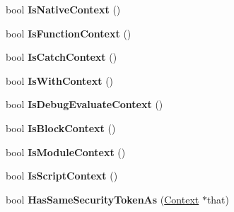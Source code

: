 \begin{DoxyCompactItemize}
\item 
bool {\bfseries Is\+Native\+Context} ()\hypertarget{classv8_1_1internal_1_1_context_a3c1dc7d83a558bb508f062821821e499}{}\label{classv8_1_1internal_1_1_context_a3c1dc7d83a558bb508f062821821e499}

\item 
bool {\bfseries Is\+Function\+Context} ()\hypertarget{classv8_1_1internal_1_1_context_ad6c48b6346d3914ece1b8a84979bc188}{}\label{classv8_1_1internal_1_1_context_ad6c48b6346d3914ece1b8a84979bc188}

\item 
bool {\bfseries Is\+Catch\+Context} ()\hypertarget{classv8_1_1internal_1_1_context_acd9e4ea343c0680ffc6b2edb9724d7e0}{}\label{classv8_1_1internal_1_1_context_acd9e4ea343c0680ffc6b2edb9724d7e0}

\item 
bool {\bfseries Is\+With\+Context} ()\hypertarget{classv8_1_1internal_1_1_context_ad2f6f05429ffa28117936bbc818962f3}{}\label{classv8_1_1internal_1_1_context_ad2f6f05429ffa28117936bbc818962f3}

\item 
bool {\bfseries Is\+Debug\+Evaluate\+Context} ()\hypertarget{classv8_1_1internal_1_1_context_a6117cf91141cc858b89ee79fc46d2d8d}{}\label{classv8_1_1internal_1_1_context_a6117cf91141cc858b89ee79fc46d2d8d}

\item 
bool {\bfseries Is\+Block\+Context} ()\hypertarget{classv8_1_1internal_1_1_context_a9cd820060e28954fc3f5760b178e37c5}{}\label{classv8_1_1internal_1_1_context_a9cd820060e28954fc3f5760b178e37c5}

\item 
bool {\bfseries Is\+Module\+Context} ()\hypertarget{classv8_1_1internal_1_1_context_a39d217bf4164d61ce611540e7ad8bce3}{}\label{classv8_1_1internal_1_1_context_a39d217bf4164d61ce611540e7ad8bce3}

\item 
bool {\bfseries Is\+Script\+Context} ()\hypertarget{classv8_1_1internal_1_1_context_a30b978a705b4d873a8ea7463e7e5c61a}{}\label{classv8_1_1internal_1_1_context_a30b978a705b4d873a8ea7463e7e5c61a}

\item 
bool {\bfseries Has\+Same\+Security\+Token\+As} (\hyperlink{classv8_1_1internal_1_1_context}{Context} $\ast$that)\hypertarget{classv8_1_1internal_1_1_context_ac51c33cefa50030e4346ce03d844e0b8}{}\label{classv8_1_1internal_1_1_context_ac51c33cefa50030e4346ce03d844e0b8}


\end{DoxyCompactItemize}
